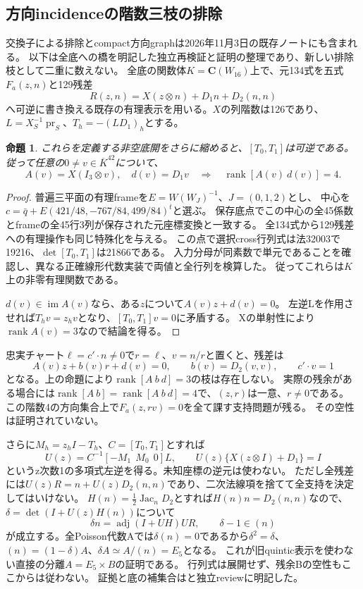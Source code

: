 \documentclass[a4paper,11pt]{ltjsarticle}
\newtheorem{proposition}{命題}[section]
\theoremstyle{definition}
\newcommand{\CC}{\mathbf C}
\newcommand{\rank}{\operatorname{rank}}
\begin{document}
\subsection{方向incidenceの階数三枝の排除}
交換子による排除とcompact方向graphは2026年11月3日の既存ノートにも含まれる。
以下は全底への橋を明記した独立再検証と証明の整理であり、新しい排除枝として二重に数えない。
全底の関数体\(K=\CC(W_{16})\)上で、元134式を五式\(F_a(z,n)\)と129残差
\[
 R(z,n)=X(z\otimes n)+D_1n+D_2(n,n)
\]
へ可逆に書き換える既存の有理表示を用いる。\(X\)の列階数は126であり、
\(L=X_S^{-1}\operatorname{pr}_S\)、\(T_h=-(LD_1)_h\)とする。
\begin{proposition}\label{prop:commutator}
これらを定義する非空底開をさらに縮めると、\([T_0,T_1]\)は可逆である。
従って任意の\(0\ne v\in\overline K^{42}\)について、
\[
 A(v)=X(I_3\otimes v),\quad d(v)=D_1v
 \quad\Longrightarrow\quad\rank[A(v)\ d(v)]=4.
\]
\end{proposition}
\begin{proof}
普遍三平面の有理frameを\(E=W(W_J)^{-1}\)、\(J=(0,1,2)\)とし、
中心を\(c=\bar q+E(421/48,-767/84,499/84)^t\)と選ぶ。
保存底点でこの中心の全45係数とframeの全45行3列が保存された元座標変換と一致する。
全134式から129残差への有理操作も同じ特殊化を与える。
この点で選択cross行列式は法32003で19216、\(\det[T_0,T_1]\)は21866である。
入力分母が同素数で単元であることを確認し、異なる正確線形代数実装で両値と全行列を検算した。
従ってこれらは\(K\)上の非零有理関数である。

\(d(v)\in\operatorname{im}A(v)\)なら、ある\(z\)について\(A(v)z+d(v)=0\)。
左逆Lを作用させれば\(T_hv=z_hv\)となり、\([T_0,T_1]v=0\)に矛盾する。
Xの単射性により\(\rank A(v)=3\)なので結論を得る。
\end{proof}

忠実チャート\(\ell=c'\cdot n\ne0\)で\(r=\ell\)、\(v=n/r\)と置くと、残差は
\[
 A(v)z+b(v)r+d(v)=0,\qquad b(v)=D_2(v,v),\qquad c'\cdot v=1
\]
となる。上の命題により\(\rank[A\ b\ d]=3\)の枝は存在しない。
実際の残余がある場合には\(\rank[A\ b]=\rank[A\ b\ d]=4\)で、\((z,r)\)は一意、\(r\ne0\)である。
この階数4の方向集合上で\(F_a(z,rv)=0\)を全て課す支持問題が残る。
その空性は証明されていない。

さらに\(M_h=z_hI-T_h\)、\(C=[T_0,T_1]\)とすれば
\[
 U(z)=C^{-1}[-M_1\ \ M_0\ \ 0]L,\qquad
 U(z)\{X(z\otimes I)+D_1\}=I
\]
というz次数1の多項式左逆を得る。未知座標の逆元は使わない。
ただし全残差には\(U(z)R=n+U(z)D_2(n,n)\)であり、二次法線項を捨てて全支持を決定してはいけない。
\(H(n)=\frac12\operatorname{Jac}_n D_2\)とすれば\(H(n)n=D_2(n,n)\)なので、
\(\delta=\det(I+U(z)H(n))\)について
\[
 \delta n=\operatorname{adj}(I+UH)UR,\qquad \delta-1\in(n)
\]
が成立する。全Poisson代数Aでは\(\delta(n)=0\)であるから\(\delta^2=\delta\)、
\((n)=(1-\delta)A\)、\(\delta A\simeq A/(n)=E_5\)となる。
これが旧quintic表示を使わない直接の分離\(A=E_5\times B\)の証明である。
行列式は展開せず、残余Bの空性もここからは従わない。
証拠と底の補集合はと独立reviewに明記した。
\end{document}
